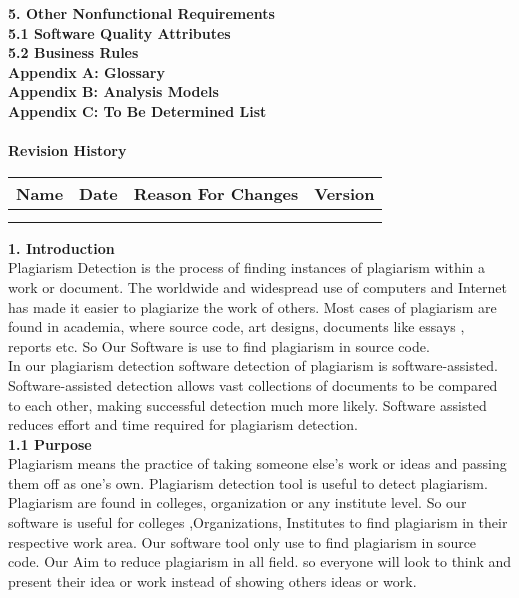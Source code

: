 \textbf{5.\hspace{0.3cm}	Other Nonfunctional Requirements}\\
\textbf{5.1	\hspace{0.3cm}Software Quality Attributes}\\
\textbf{5.2	\hspace{0.3cm}Business Rules}\\
\textbf{Appendix A: Glossary}\\
\textbf{Appendix B: Analysis Models}\\
\textbf{Appendix C: To Be Determined List}\\\\

\textbf{\huge Revision History}\\

\begin{center}
\begin{tabular}{ |c|c|c|c| } 

 \hline
 Name & Date & Reason For Changes & Version \\ [0.5ex] 
  \hline
  &  &  &  \\ 
  \hline
  &  &   & \\ 
  \hline
\end{tabular}
\end{center}
\textbf{1.	Introduction}\\
 Plagiarism Detection is the process of finding  instances of plagiarism within a work or document. The worldwide and widespread use of computers and  Internet has made it easier to plagiarize the work of others. Most cases of plagiarism are found in academia, where source code, art designs, documents like essays , reports etc. So Our Software is use to find plagiarism in source code.\\
In our plagiarism detection software detection of plagiarism is software-assisted. Software-assisted detection allows vast collections of documents to be compared to each other, making successful detection much more likely. Software assisted reduces effort and time required for plagiarism detection. \\
\textbf{1.1	Purpose }\\
Plagiarism means  the practice of taking someone else's work or ideas and passing them off as one's own. Plagiarism detection tool is useful to detect plagiarism. Plagiarism are found in colleges, organization or any institute level. So our software is useful for colleges ,Organizations, Institutes to find plagiarism in their respective work area. Our software tool  only use to find plagiarism in source code. Our Aim to reduce plagiarism in all field. so everyone will look to think and present their idea or work instead of showing others ideas or work.\\
